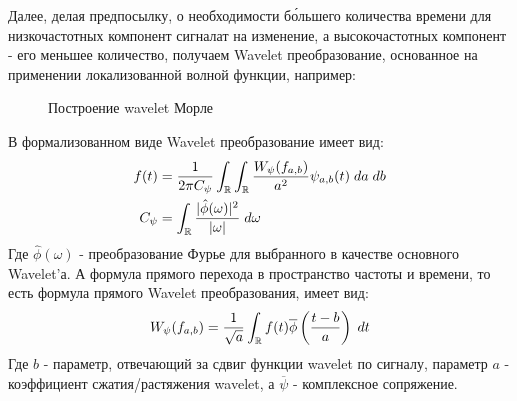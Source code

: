 Далее, делая предпосылку, о необходимости б\'{о}льшего количества времени для низкочастотных компонент сигналат на изменение, а высокочастотных компонент - его меньшее количество, получаем Wavelet преобразование, основанное на применении локализованной волной функции, например:
\begin{figure}[H]
	\centering
	\caption{Построение wavelet Морле}
\end{figure}
В формализованном виде Wavelet преобразование имеет вид:
\begin{equation}
	\begin{split}
		f(t) & = \frac{1}{2\pi C_{\psi}} \int_{\mathbb{R}} \int_{\mathbb{R}} \frac{W_{\psi}(f_{a, b})}{a^2}\psi_{a, b}(t) \; da \; db\\
		C_{\psi} & = \int_{\mathbb{R}} \frac{|\hat{\phi}(\omega)|^2}{|\omega|} \; d \omega
	\end{split}
\end{equation}
Где $\hat{\phi}(\omega)$ - преобразование Фурье для выбранного в качестве основного Wavelet'а. А формула прямого перехода в пространство частоты и времени, то есть формула прямого Wavelet преобразования, имеет вид:
\begin{equation}
	W_{\psi}(f_{a, b}) = \frac{1}{\sqrt{a}}\int_{\mathbb{R}}f(t) \overline{\phi}\left( \frac{t - b}{a} \right) \; dt
\end{equation}
Где $b$ - параметр, отвечающий за сдвиг функции wavelet по сигналу, параметр $a$ - коэффициент сжатия/растяжения wavelet, а $\overline{\psi}$ - комплексное сопряжение.

